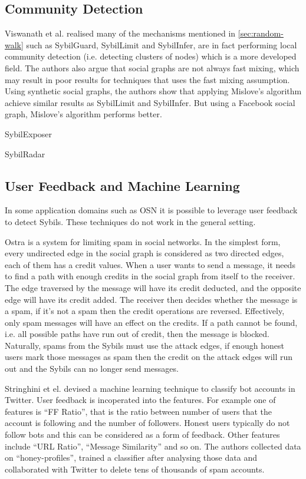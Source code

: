 \subsection{Community Detection}
Viswanath et al. realised many of the mechanisms mentioned in
\autoref{sec:random-walk} such as SybilGuard, SybilLimit and SybilInfer, are in
fact performing local community detection (i.e. detecting clusters of nodes)
which is a more developed field\cite{viswanath2010analysis}. The authors also
argue that social graphs are not always fast mixing, which may result in poor
results for techniques that uses the fast mixing assumption. Using synthetic
social graphs, the authors show that applying Mislove's
algorithm\cite{mislove2010you} achieve similar results as SybilLimit and
SybilInfer. But using a Facebook social graph, Mislove's algorithm performs
better.

SybilExposer\cite{misra2016sybilexposer}

SybilRadar\cite{mulamba2016sybilradar}

\subsection{User Feedback and Machine Learning}
In some application domains such as OSN it is possible to leverage user feedback
to detect Sybils. These techniques do not work in the general setting.

Ostra\cite{mislove2008ostra} is a system for limiting spam in social networks.
In the simplest form, every undirected edge in the social graph is considered as
two directed edges, each of them has a credit values. When a user wants to send
a message, it needs to find a path with enough credits in the social graph from
itself to the receiver. The edge traversed by the message will have its credit
deducted, and the opposite edge will have its credit added. The receiver then
decides whether the message is a spam, if it's not a spam then the credit
operations are reversed. Effectively, only spam messages will have an effect on
the credits. If a path cannot be found, i.e. all possible paths have run out of
credit, then the message is blocked. Naturally, spams from the Sybils must use
the attack edges, if enough honest users mark those messages as spam then the
credit on the attack edges will run out and the Sybils can no longer send
messages.

Stringhini et el. devised a machine learning technique to classify bot accounts 
in Twitter\cite{stringhini2010detecting}. User feedback is incoperated into the
features. For example one of features is ``FF Ratio'', that is the ratio between
number of users that the account is following and the number of followers.
Honest users typically do not follow bots and this can be considered as a form
of feedback. Other features include ``URL Ratio'', ``Message Similarity'' and so
on. The authors collected data on ``honey-profiles'', trained a classifier after
analysing those data and collaborated with Twitter to delete tens of thousands
of spam accounts.

